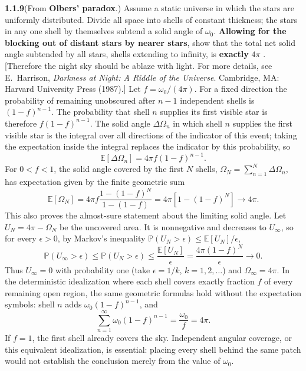 \par\bigskip
\noindent\textbf{1.1.9}\quad (From \textbf{Olbers' paradox}.) Assume a static
universe in which the stars are uniformly distributed. Divide all space into
shells of constant thickness; the stars in any one shell by themselves subtend
a solid angle of $\omega_{0}$. \textbf{Allowing for the blocking out of distant
stars by nearer stars}, show that the total net solid angle subtended by all
stars, shells extending to infinity, is \textbf{exactly} $4\pi$ . [Therefore the
night sky should be ablaze with light. For more details, see E.~Harrison,
\emph{Darkness at Night: A Riddle of the Universe}. Cambridge, MA: Harvard
University Press (1987).]
\solution
{}
Let $f=\omega_0/(4\pi)$. For a fixed direction the probability of
remaining unobscured after $n-1$ independent shells is $(1-f)^{n-1}$.
The probability that shell $n$ supplies its first visible star is
therefore $f(1-f)^{n-1}$. The solid angle $\Delta\Omega_n$ in which
shell $n$ supplies the first visible star is the integral over all
directions of the indicator of this event; taking the expectation inside
the integral replaces the indicator by this probability, so
\[
 \mathbb E[\Delta\Omega_n]=4\pi f(1-f)^{n-1}.
\]
For $0<f<1$, the solid angle covered by the first $N$ shells,
$\Omega_N=\sum_{n=1}^N\Delta\Omega_n$, has expectation given by the finite
geometric sum
\[
 \mathbb E[\Omega_N]=4\pi f\frac{1-(1-f)^N}{1-(1-f)}
         =4\pi[1-(1-f)^N]\longrightarrow4\pi.
\]
This also proves the almost-sure statement about the limiting solid
angle. Let $U_N=4\pi-\Omega_N$ be the uncovered area. It is nonnegative
and decreases to $U_\infty$, so for every $\epsilon>0$, by Markov's
inequality $\mathbb P(U_N>\epsilon)\le\mathbb E[U_N]/\epsilon$,
\[
 \mathbb P(U_\infty>\epsilon)\le\mathbb P(U_N>\epsilon)
 \le\frac{\mathbb E[U_N]}{\epsilon}
 =\frac{4\pi(1-f)^N}{\epsilon}\longrightarrow0.
\]
Thus $U_\infty=0$ with probability one (take $\epsilon=1/k$,
$k=1,2,\ldots$) and $\Omega_\infty=4\pi$.
In the deterministic idealization where each shell covers exactly
fraction $f$ of every remaining open region, the same geometric formulas
hold without the expectation symbols: shell $n$ adds
$\omega_0(1-f)^{n-1}$, and
\[
 \sum_{n=1}^\infty\omega_0(1-f)^{n-1}=\frac{\omega_0}{f}=4\pi.
\]
If $f=1$, the first shell already covers the sky. Independent angular coverage, or this equivalent
idealization, is essential: placing every shell behind the same patch
would not establish the conclusion merely from the value of $\omega_0$.

